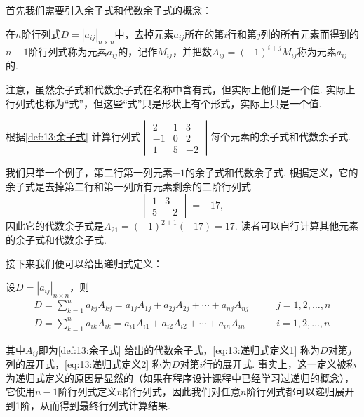 首先我们需要引入余子式和代数余子式的概念：
\begin{definition} \label{def:13:余子式}
    在$n$阶行列式$D=|a_{ij}|_{n \times n}$中，去掉元素$a_{ij}$所在的第$i$行和第$j$列的所有元素而得到的$n-1$阶行列式称为元素$a_{ij}$的，记作$M_{ij}$，并把数$A_{ij}=(-1)^{i+j}M_{ij}$称为元素$a_{ij}$的.
\end{definition}
注意，虽然余子式和代数余子式在名称中含有式，但实际上他们是一个值. 实际上行列式也称为``式''，但这些``式''只是形状上有个形式，实际上只是一个值.
\begin{example} \label{ex:13:余子式}
    根据\autoref{def:13:余子式} 计算行列式$\begin{vmatrix}
            2  & 1 & 3  \\
            -1 & 0 & 2  \\
            1  & 5 & -2
        \end{vmatrix}$每个元素的余子式和代数余子式.
\end{example}

\begin{solution}
    我们只举一个例子，第二行第一列元素$-1$的余子式和代数余子式. 根据定义，它的余子式是去掉第二行和第一列所有元素剩余的二阶行列式
    \[\begin{vmatrix}
            1 & 3  \\
            5 & -2
        \end{vmatrix}=-17,\]
    因此它的代数余子式是$A_{21}=(-1)^{2+1}(-17)=17$. 读者可以自行计算其他元素的余子式和代数余子式.
\end{solution}

接下来我们便可以给出递归式定义：
\begin{definition} \label{def:13:递归式定义}
    设$D=|a_{ij}|_{n \times n}$，则
    \begin{align}
        \label{eq:13:递归式定义1}
        D=\sum_{k=1}^{n}a_{kj}A_{kj}=a_{1j}A_{1j}+a_{2j}A_{2j}+\cdots+a_{nj}A_{nj} & \qquad j=1,2,\ldots,n \\
        \label{eq:13:递归式定义2}
        D=\sum_{k=1}^{n}a_{ik}A_{ik}=a_{i1}A_{i1}+a_{i2}A_{i2}+\cdots+a_{in}A_{in} & \qquad i=1,2,\ldots,n
    \end{align}
\end{definition}
其中$A_{ij}$即为\autoref{def:13:余子式} 给出的代数余子式，\autoref{eq:13:递归式定义1} 称为$D$对第$j$列的展开式，\autoref{eq:13:递归式定义2} 称为$D$对第$i$行的展开式. 事实上，这一定义被称为递归式定义的原因是显然的（如果在程序设计课程中已经学习过递归的概念），它使用$n-1$阶行列式定义$n$阶行列式，因此我们对任意$n$阶行列式都可以递归展开到1阶，从而得到最终行列式计算结果.

